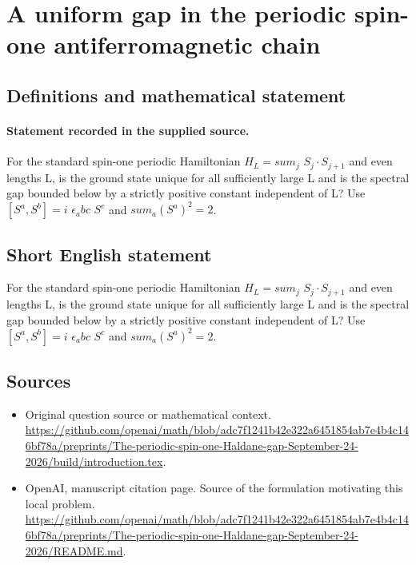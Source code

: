 \documentclass[11pt]{article}
\begin{document}
\section*{A uniform gap in the periodic spin-one antiferromagnetic chain}\label{statement}
\subsection{Definitions and mathematical statement}
\paragraph{Statement recorded in the supplied source.}
For the standard spin-one periodic Hamiltonian $H_L=sum_j$ $S_j\cdot S_{j+1}$ and even lengths L, is the ground state unique for all sufficiently large L and is the spectral gap bounded below by a strictly positive constant independent of L? Use $[S^a,S^b]=i$ $\epsilon _abc$ $S^c$ and $sum_a(S^a)^2=2$.
\subsection{Short English statement}
For the standard spin-one periodic Hamiltonian $H_L=sum_j$ $S_j\cdot S_{j+1}$ and even lengths L, is the ground state unique for all sufficiently large L and is the spectral gap bounded below by a strictly positive constant independent of L? Use $[S^a,S^b]=i$ $\epsilon _abc$ $S^c$ and $sum_a(S^a)^2=2$.
\subsection{Sources}
\begin{itemize}
\item[S1] Original question source or mathematical context.
\url{https://github.com/openai/math/blob/adc7f1241b42e322a6451854ab7e4b4c146bf78a/preprints/The-periodic-spin-one-Haldane-gap-September-24-2026/build/introduction.tex}.
\item[S2] OpenAI, manuscript citation page. Source of the formulation motivating this local problem.
\url{https://github.com/openai/math/blob/adc7f1241b42e322a6451854ab7e4b4c146bf78a/preprints/The-periodic-spin-one-Haldane-gap-September-24-2026/README.md}.
\end{itemize}
\end{document}
